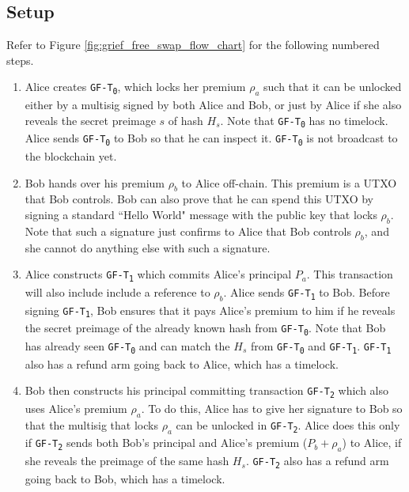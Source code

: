 \subsection{Setup}
Refer to Figure \ref{fig:grief_free_swap_flow_chart} for the following numbered steps.
\begin{enumerate}
    \item Alice creates \texttt{GF-T\textsubscript{0}}, which locks her premium $\rho_a$ such that it can be unlocked either by a multisig signed by both Alice and Bob, or just by Alice if she also reveals the secret preimage $s$ of hash $H_s$. Note that \texttt{GF-T\textsubscript{0}} has no timelock. Alice sends \texttt{GF-T\textsubscript{0}} to Bob so that he can inspect it. \texttt{GF-T\textsubscript{0}} is not broadcast to the blockchain yet.
    \item Bob hands over his premium $\rho_b$ to Alice off-chain. This premium is a UTXO that Bob controls. Bob can also prove that he can spend this UTXO by signing a standard ``Hello World" message with the public key that locks $\rho_b$. Note that such a signature just confirms to Alice that Bob controls $\rho_b$, and she cannot do anything else with such a signature.
    \item Alice constructs \texttt{GF-T\textsubscript{1}} which commits Alice's principal $P_a$. This transaction will also include include a reference to $\rho_b$. Alice sends \texttt{GF-T\textsubscript{1}} to Bob. Before signing \texttt{GF-T\textsubscript{1}}, Bob ensures that it pays Alice's premium to him if he reveals the secret preimage of the already known hash from \texttt{GF-T\textsubscript{0}}. Note that Bob has already seen \texttt{GF-T\textsubscript{0}} and can match the $H_s$ from \texttt{GF-T\textsubscript{0}} and \texttt{GF-T\textsubscript{1}}. \texttt{GF-T\textsubscript{1}} also has a refund arm going back to Alice, which has a timelock. 
    \item Bob then constructs his principal committing transaction \texttt{GF-T\textsubscript{2}} which also uses Alice's premium $\rho_a$. To do this, Alice has to give her signature to Bob so that the multisig that locks $\rho_a$ can be unlocked in \texttt{GF-T\textsubscript{2}}. Alice does this only if \texttt{GF-T\textsubscript{2}} sends both Bob's principal and Alice's premium ($P_b + \rho_a$) to Alice, if she reveals the preimage of the same hash $H_s$. \texttt{GF-T\textsubscript{2}} also has a refund arm going back to Bob, which has a timelock. 
\end{enumerate} 

